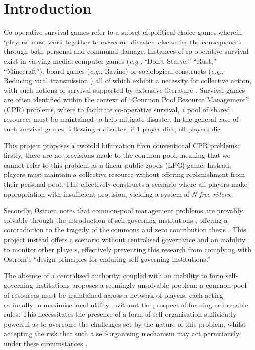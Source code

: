 \chapter{Introduction}\label{introduction}

Co-operative survival games refer to a subset of political choice games wherein `players' must work together to overcome disaster, else suffer the consequences through both personal and communal damage. Instances of co-operative survival exist in varying media: computer games (\emph{e.g.}, ``Don't Starve,'' ``Rust,'' ``Minecraft''), board games (\emph{e.g.}, Ravine) or sociological constructs (\emph{e.g.}, Reducing viral transmission ) all of which exhibit a necessity for collective action, with such notions of survival supported by extensive literature \cite{su10030652}. Survival games are often identified within the context of ``Common Pool Resource Management'' (CPR) \cite{ostromCollectiveAction} \cite{smartHome} problems, where to facilitate co-operative survival, a pool of shared resources must be maintained to help mitigate disaster. In the general case of such survival games, following a disaster, if 1 player dies, all players die.

This project proposes a twofold bifurcation from conventional CPR problems: firstly, there are no provisions made to the common pool, meaning that we cannot refer to this problem as a linear public goods (LPG) game. Instead, players must maintain a collective resource without offering replenishment from their personal pool. This effectively constructs a scenario where all players make appropriation with insufficient provision, yielding a system of \textit{N free-riders}. 

Secondly, Ostrom notes that common-pool management problems are provably solvable through the introduction of self governing institutions \cite{ostromCollectiveAction}, offering a contradiction to the tragedy of the commons and zero contribution thesis \cite{zeroCon}. This project instead offers a scenario without centralised governance and an inability to monitor other players, effectively preventing this research from complying with Ostrom’s ``design principles for enduring self-governing institutions.''

The absence of a centralised authority, coupled with an inability to form self-governing institutions proposes a seemingly unsolvable problem: a common pool of resources must be maintained across a network of players, each acting rationally to maximise local utility \cite{oberUtil}, without the prospect of forming enforceable rules. This necessitates the presence of a form of self-organisation sufficiently powerful as to overcome the challenges set by the nature of this problem, whilst accepting the risk that such a self-organising mechanism may act perniciously under these circumstances \cite{dobSteg}.

